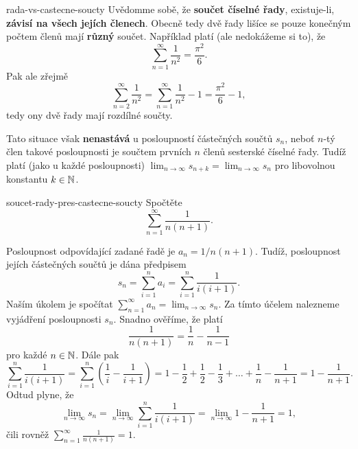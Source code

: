 \begin{warning}{}{rada-vs-castecne-soucty}
 Uvědomme sobě, že \textbf{součet číselné řady}, existuje-li, \textbf{závisí na
 všech jejích členech}. Obecně tedy dvě řady lišíce se pouze konečným počtem
 členů mají \textbf{různý} součet. Například platí (ale nedokážeme si to), že
 \[
  \sum_{n=1}^{\infty} \frac{1}{n^2} = \frac{\pi^2}{6}.
 \]
 Pak ale zřejmě
 \[
  \sum_{n=2}^{\infty} \frac{1}{n^2} = \sum_{n=1}^{\infty} \frac{1}{n^2} - 1 =
  \frac{\pi^2}{6} - 1,
 \]
 tedy ony dvě řady mají rozdílné součty.

 Tato situace však \textbf{nenastává} u posloupností částečných součtů $s_n$,
 neboť $n$-tý člen takové posloupnosti je součtem prvních $n$ členů sesterské
 číselné řady. Tudíž platí (jako u každé posloupnosti) $\lim_{n \to \infty}
 s_{n+k} = \lim_{n \to \infty} s_n$ pro libovolnou konstantu $k \in \mathbb{N}$.
\end{warning}

\begin{problem}{}{soucet-rady-pres-castecne-soucty}
 Spočtěte
 \[
  \sum_{n=1}^{\infty} \frac{1}{n(n+1)}.
 \]
\end{problem}
\begin{probsol}
 Posloupnost odpovídající zadané řadě je $a_n = 1 / n(n+1)$. Tudíž, posloupnost
 jejích částečných součtů je dána předpisem
 \[
  s_n = \sum_{i=1}^{n} a_i = \sum_{i=1}^n \frac{1}{i(i+1)}.
 \]
 Naším úkolem je spočítat $\sum_{n=1}^{\infty} a_n = \lim_{n \to \infty} s_n$.
 Za tímto účelem nalezneme  vyjádření posloupnosti $s_n$. Snadno
 ověříme, že platí
 \[
  \frac{1}{n(n+1)} = \frac{1}{n} - \frac{1}{n-1}
 \]
 pro každé $n \in \mathbb{N}$. Dále pak
 \[
  \sum_{i = 1}^{n} \frac{1}{i(i+1)} = \sum_{i=1}^n \left( \frac{1}{i} -
  \frac{1}{i+1} \right) = 1 - \frac{1}{2} + \frac{1}{2} - \frac{1}{3} + \ldots +
  \frac{1}{n} - \frac{1}{n + 1} = 1 - \frac{1}{n+1}.
 \]
 Odtud plyne, že
 \[
  \lim_{n \to \infty} s_n = \lim_{n \to \infty} \sum_{i = 1}^{n}
  \frac{1}{i(i+1)} = \lim_{n \to \infty} 1 - \frac{1}{n+1} = 1,
 \]
 čili rovněž $\sum_{n=1}^{\infty} \frac{1}{n(n+1)} = 1$.
\end{probsol}


